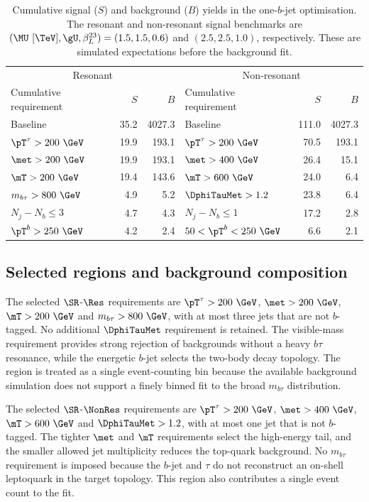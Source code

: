 \begin{table}[htbp]
    \centering
    \small
    \caption{Cumulative signal ($S$) and background ($B$) yields in the one-$b$-jet optimisation. The resonant and non-resonant signal benchmarks are $(\MU~[\TeV],\gU,\beta_L^{23})=(1.5,1.5,0.6)$ and $(2.5,2.5,1.0)$, respectively. These are simulated expectations before the background fit.}
    \label{tab:ch7_cutflow}
    \begin{tabular}{lrrlrr}
        \toprule
        \multicolumn{3}{c}{Resonant} & \multicolumn{3}{c}{Non-resonant} \\
        Cumulative requirement & $S$ & $B$ & Cumulative requirement & $S$ & $B$ \\
        \midrule
        Baseline & 35.2 & 4027.3 & Baseline & 111.0 & 4027.3 \\
        $\pT^\tau>200~\GeV$ & 19.9 & 193.1 & $\pT^\tau>200~\GeV$ & 70.5 & 193.1 \\
        $\met>200~\GeV$ & 19.9 & 193.1 & $\met>400~\GeV$ & 26.4 & 15.1 \\
        $\mT>200~\GeV$ & 19.4 & 143.6 & $\mT>600~\GeV$ & 24.0 & 6.4 \\
        $m_{b\tau}>800~\GeV$ & 4.9 & 5.2 & $\DphiTauMet>1.2$ & 23.8 & 6.4 \\
        $N_j-N_b\leq3$ & 4.7 & 4.3 & $N_j-N_b\leq1$ & 17.2 & 2.8 \\
        $\pT^b>250~\GeV$ & 4.2 & 2.4 & $50<\pT^b<250~\GeV$ & 6.6 & 2.1 \\
        \bottomrule
    \end{tabular}
\end{table}

\subsection{Selected regions and background composition}

The selected $\SR$-$\Res$ requirements are $\pT^\tau>200~\GeV$, $\met>200~\GeV$, $\mT>200~\GeV$ and $m_{b\tau}>800~\GeV$, with at most three jets that are not $b$-tagged.
No additional $\DphiTauMet$ requirement is retained.
The visible-mass requirement provides strong rejection of backgrounds without a heavy $b\tau$ resonance, while the energetic $b$-jet selects the two-body decay topology.
The region is treated as a single event-counting bin because the available background simulation does not support a finely binned fit to the broad $m_{b\tau}$ distribution.

The selected $\SR$-$\NonRes$ requirements are $\pT^\tau>200~\GeV$, $\met>400~\GeV$, $\mT>600~\GeV$ and $\DphiTauMet>1.2$, with at most one jet that is not $b$-tagged.
The tighter $\met$ and $\mT$ requirements select the high-energy tail, and the smaller allowed jet multiplicity reduces the top-quark background.
No $m_{b\tau}$ requirement is imposed because the $b$-jet and $\tau$ do not reconstruct an on-shell leptoquark in the target topology.
This region also contributes a single event count to the fit.


